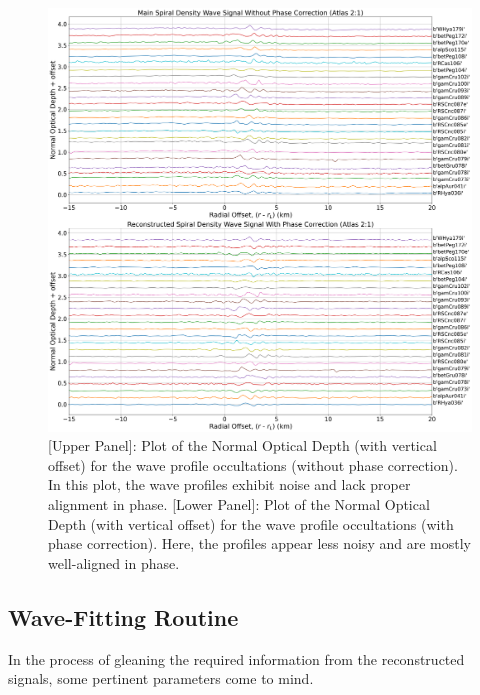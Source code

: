 \documentclass{article}
\begin{document}


\begin{figure}[h]
    \centering
    \includegraphics[width=0.5\linewidth]{main_and_reconstructed_profiles_atlas21_satellite_waves.png}
    \caption{[Upper Panel]: Plot of the Normal Optical Depth (with vertical offset) for the wave profile occultations (without phase correction). In this plot, the wave profiles exhibit noise and lack proper alignment in phase. [Lower Panel]: Plot of the Normal Optical Depth (with vertical offset) for the wave profile occultations (with phase correction). Here, the profiles appear less noisy and are mostly well-aligned in phase.}
    \label{fig:enter-label}
\end{figure}


\subsection{Wave-Fitting Routine}
In the process of gleaning the required information from the reconstructed signals, some pertinent parameters come to mind. 
\end{document}

